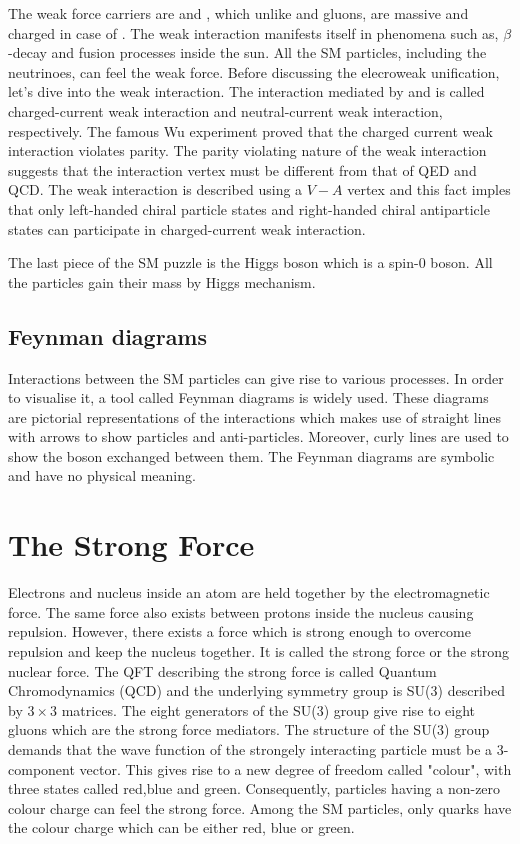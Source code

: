 The weak force carriers are \PWpm and \PZ, which unlike \Pphoton and 
gluons, are massive and charged in case of \PWpm. The weak interaction manifests
itself in phenomena such as, $\beta$-decay and fusion processes inside the sun. All the
SM particles, including the neutrinoes, can feel the weak force. 
Before discussing the elecroweak unification, let's dive into the weak interaction. 
The interaction mediated by \PWpm and \PZ is called charged-current weak interaction and
neutral-current weak interaction, respectively. The famous Wu experiment proved that the charged
current weak interaction violates parity. The parity violating nature of the weak interaction
suggests that the interaction vertex must be different from that of QED and QCD. The weak 
interaction is described using a $V-A$ vertex and this fact imples that only left-handed
chiral particle states and right-handed chiral antiparticle states can participate in 
charged-current weak interaction. 

The last piece of the SM puzzle is the Higgs boson which is a spin-0 boson. All the
particles gain their mass by Higgs mechanism. 

\subsection{Feynman diagrams}

Interactions between the SM particles can give rise to various processes. In order to
visualise it, a tool called Feynman diagrams is widely used. These diagrams are 
pictorial representations of the interactions which makes use of straight lines with 
arrows to show particles and anti-particles. Moreover, curly lines are used to show
the boson exchanged between them. The Feynman diagrams are symbolic and have no 
physical meaning. 

\section{The Strong Force}
Electrons and nucleus inside an atom are held together by the electromagnetic force. The same 
force also exists between protons inside the nucleus causing repulsion. However, there exists a force
which is strong enough to overcome repulsion and keep the nucleus together. It is called the strong force or 
the strong nuclear force. The QFT describing the strong force is called Quantum Chromodynamics (QCD) and the
underlying symmetry group is SU(3) described by $3 \times 3$ matrices. The eight generators of the SU(3) group
give rise to eight gluons which are the strong force mediators. The structure of the SU(3) group demands that 
the wave function of the strongely interacting particle must be a 3-component vector. This gives rise to 
a new degree of freedom called "colour", with three states called red,blue and green. Consequently, particles
having a non-zero colour charge can feel the strong force. Among the SM particles, only quarks have the colour
charge which can be either red, blue or green.

